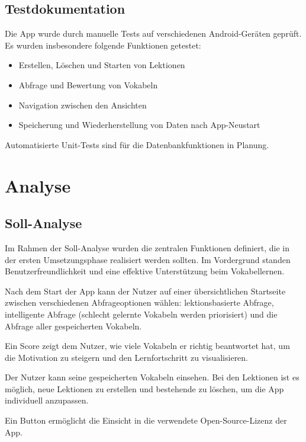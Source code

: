 \documentclass[12pt,a4paper]{article}
\begin{document}
\subsection{Testdokumentation}
Die App wurde durch manuelle Tests auf verschiedenen Android-Geräten geprüft. Es wurden insbesondere folgende Funktionen getestet:
\begin{itemize}
\item Erstellen, Löschen und Starten von Lektionen
\item Abfrage und Bewertung von Vokabeln
\item Navigation zwischen den Ansichten
\item Speicherung und Wiederherstellung von Daten nach App-Neustart
\end{itemize}
Automatisierte Unit-Tests sind für die Datenbankfunktionen in Planung.

\section{Analyse}

\subsection{Soll-Analyse}
Im Rahmen der Soll-Analyse wurden die zentralen Funktionen definiert, die in der ersten Umsetzungsphase realisiert werden sollten. Im Vordergrund standen Benutzerfreundlichkeit und eine effektive Unterstützung beim Vokabellernen.

Nach dem Start der App kann der Nutzer auf einer übersichtlichen Startseite zwischen verschiedenen Abfrageoptionen wählen: lektionsbasierte Abfrage, intelligente Abfrage (schlecht gelernte Vokabeln werden priorisiert) und die Abfrage aller gespeicherten Vokabeln.

Ein Score zeigt dem Nutzer, wie viele Vokabeln er richtig beantwortet hat, um die Motivation zu steigern und den Lernfortschritt zu visualisieren.

Der Nutzer kann seine gespeicherten Vokabeln einsehen. Bei den Lektionen ist es möglich, neue Lektionen zu erstellen und bestehende zu löschen, um die App individuell anzupassen.

Ein Button ermöglicht die Einsicht in die verwendete Open-Source-Lizenz der App.
\end{document}
